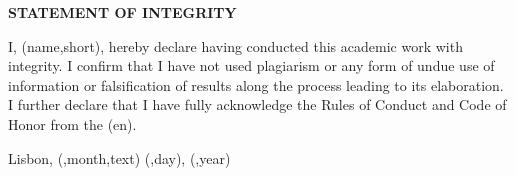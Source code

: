 
%

\thispagestyle{empty}

\begingroup
\setlength{\parskip}{1ex plus 1pt minus 1pt}
\setlength{\parindent}{0cm}
\begin{center}
  \textbf{STATEMENT OF INTEGRITY}
\end{center}

I, \thedocauthor(name,short), hereby declare having conducted this academic work with integrity.
I confirm that I have not used plagiarism or any form of undue use of information or falsification of results along the process leading to its elaboration.
I further declare that I have fully acknowledge the Rules of Conduct and Code of Honor from the \theschool(en).

\bigskip


Lisbon, \thentdocdate(\@DATE,month,text) \thentdocdate(\@DATE,day), \thentdocdate(\@DATE,year)

\endgroup
\clearforchapter
